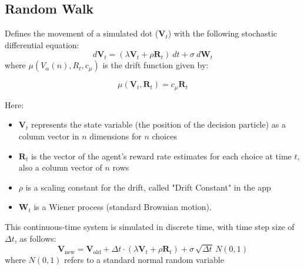 \subsection{Random Walk}
Defines the movement of a simulated dot (\(\mathbf{V}_t\)) with the following stochastic differential equation:  
\[d\mathbf{V}_t =  (\lambda \mathbf{V}_t + \rho \mathbf{R}_t) \ dt + \sigma \ d\mathbf{W}_t\]
where \(\mu(V_\alpha(n), R_t, c_\mu)\) is the drift function given by:

\[\mu(\mathbf{V}_t, \mathbf{R}_t) = c_\mu  \mathbf{R}_t\]

Here:
\begin{itemize}
    \item \(\mathbf{V}_t\) represents the state variable (the position of the decision particle) as a column vector in $n$ dimensions for $n$ choices
    \item \(\mathbf{R}_t\) is the vector of the agent's reward rate estimates for each choice at time \(t\), also a column vector of $n$ rows
    \item $\rho$ is a scaling constant for the drift, called "Drift Constant" in the app
    \item \(\mathbf{W}_t\) is a Wiener process (standard Brownian motion).
\end{itemize}

This continuous-time system is simulated in discrete time, with time step size of $\Delta t$, as follows:
\[\mathbf{V}_{\mathrm{new}} = \mathbf{V}_\mathrm{old} + \Delta t \cdot (\lambda\mathbf{V}_t + \rho \mathbf{R}_t) + \sigma \,\sqrt{\Delta t} \, N(0,1) \]
where $N(0,1)$ refers to a standard normal random variable

